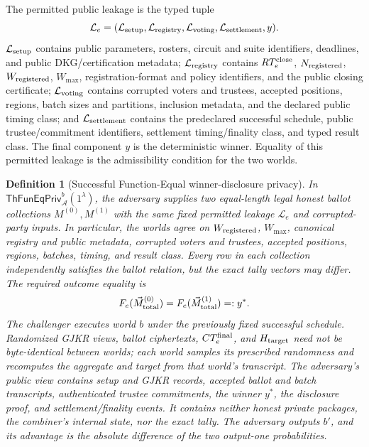 \documentclass[pdflatex,sn-mathphys-num]{sn-jnl}%
\theoremstyle{thmstyleone}%
\theoremstyle{thmstyletwo}%
\theoremstyle{thmstylethree}%
\newtheorem{definition}{Definition}%
\begin{document}
The permitted public leakage is the typed tuple
\[
 \mathcal L_e=(\mathcal L_{\rm setup},\mathcal L_{\rm registry},
 \mathcal L_{\rm voting},\mathcal L_{\rm settlement},y).
\]
$\mathcal L_{\rm setup}$ contains public parameters, rosters, circuit and
suite identifiers, deadlines, and public DKG/certification metadata;
$\mathcal L_{\rm registry}$ contains $RT_e^{\rm close}$,
$N_{\rm registered}$, $W_{\rm registered}$, $W_{\max}$, registration-format
and policy identifiers, and the public closing certificate;
$\mathcal L_{\rm voting}$ contains corrupted voters and trustees, accepted
positions, regions, batch sizes and partitions, inclusion metadata, and the
declared public timing class; and $\mathcal L_{\rm settlement}$ contains the
predeclared successful schedule, public trustee/commitment identifiers,
settlement timing/finality class, and typed result class.  The final component
$y$ is the deterministic winner.  Equality of this permitted leakage is the
admissibility condition for the two worlds.

\begin{definition}[Successful Function-Equal winner-disclosure privacy]
\label{def:th-function-equal}
In $\mathsf{ThFunEqPriv}^{b}_{\mathcal A}(1^\lambda)$, the adversary supplies
two equal-length legal honest ballot collections $M^{(0)},M^{(1)}$ with the
same fixed permitted leakage $\mathcal L_e$ and corrupted-party inputs.  In
particular, the worlds agree on $W_{\rm registered}$, $W_{\max}$, canonical
registry and public metadata, corrupted voters and trustees, accepted
positions, regions, batches, timing, and result class.  Every row in each
collection independently satisfies the ballot relation, but the exact tally
vectors may differ.  The required outcome equality is
\[
 F_e(\vec M_{\rm total}^{(0)})=F_e(\vec M_{\rm total}^{(1)})=:y^*.
\]
The challenger executes world $b$ under the previously fixed successful
schedule.  Randomized GJKR views, ballot ciphertexts, $CT_e^{\rm final}$, and
$H_{\rm target}$ need not be byte-identical between worlds; each world samples
its prescribed randomness and recomputes the aggregate and target from that
world's transcript.  The adversary's public view contains setup and GJKR records, accepted ballot and
batch transcripts, authenticated trustee commitments, the winner $y^*$, the
disclosure proof, and settlement/finality events.  It contains neither honest
private packages, the combiner's internal state, nor the exact tally.  The adversary outputs $b'$, and its
advantage is the absolute difference of the two output-one probabilities.
\end{definition}
\end{document}

